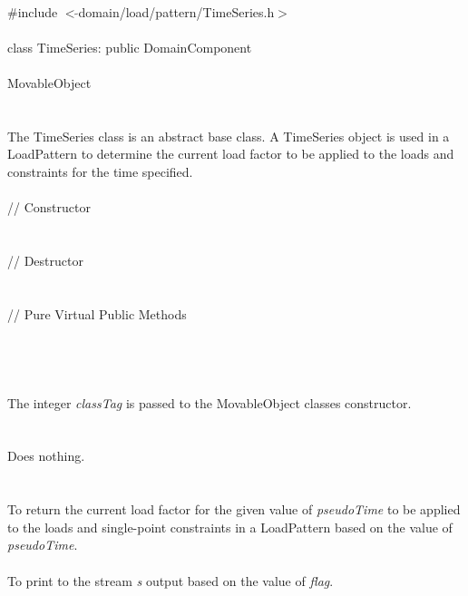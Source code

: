 
   \\
\indent \#include $<\tilde{ }$domain/load/pattern/TimeSeries.h$>$  \\

  \\
\indent class TimeSeries: public DomainComponent  \\

 \\
\indent MovableObject \\
\indent{} \\

 \\ 
\indent The TimeSeries class is an abstract base class. A
TimeSeries object is used in a LoadPattern to determine the current
load factor to be applied to the loads and constraints for the time
specified. \\ 

 \\
\indent // Constructor \\ 
\\ \\
\indent // Destructor \\ 
\\  \\
\indent // Pure Virtual Public Methods \\ 
\\
\\

 \\ 
\\ 
The integer {\em classTag} is passed to the MovableObject classes
constructor. \\

 \\
\\ 
Does nothing. \\

 \\
\\
To return the current load factor for the given value of {\em
pseudoTime} to be applied to the loads and single-point constraints in
a LoadPattern based on the value of {\em pseudoTime}. \\

\\
To print to the stream {\em s} output based on the value of {\em flag}.